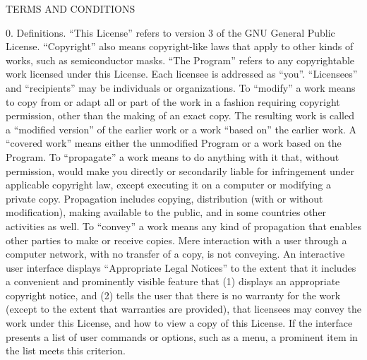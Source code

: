 \documentclass {book}
\begin{document}
\begin{tiny}
TERMS AND CONDITIONS

0. Definitions. ``This License'' refers to version 3 of the GNU General Public License. ``Copyright'' also means copyright-like laws that apply to other kinds of works, such as semiconductor masks. ``The Program'' refers to any copyrightable work licensed under this License. Each licensee is addressed as ``you''. ``Licensees'' and ``recipients'' may be individuals or organizations. To ``modify'' a work means to copy from or adapt all or part of the work in a fashion requiring copyright permission, other than the making of an exact copy. The resulting work is called a ``modified version'' of the earlier work or a work ``based on'' the earlier work. A ``covered work'' means either the unmodified Program or a work based on the Program. To ``propagate'' a work means to do anything with it that, without permission, would make you directly or secondarily liable for infringement under applicable copyright law, except executing it on a computer or modifying a private copy. Propagation includes copying, distribution (with or without modification), making available to the public, and in some countries other activities as well. To ``convey'' a work means any kind of propagation that enables other parties to make or receive copies. Mere interaction with a user through a computer network, with no transfer of a copy, is not conveying. An interactive user interface displays ``Appropriate Legal Notices'' to the extent that it includes a convenient and prominently visible feature that (1) displays an appropriate copyright notice, and (2) tells the user that there is no warranty for the work (except to the extent that warranties are provided), that licensees may convey the work under this License, and how to view a copy of this License. If the interface presents a list of user commands or options, such as a menu, a prominent item in the list meets this criterion.


\end{tiny}
\end{document}
